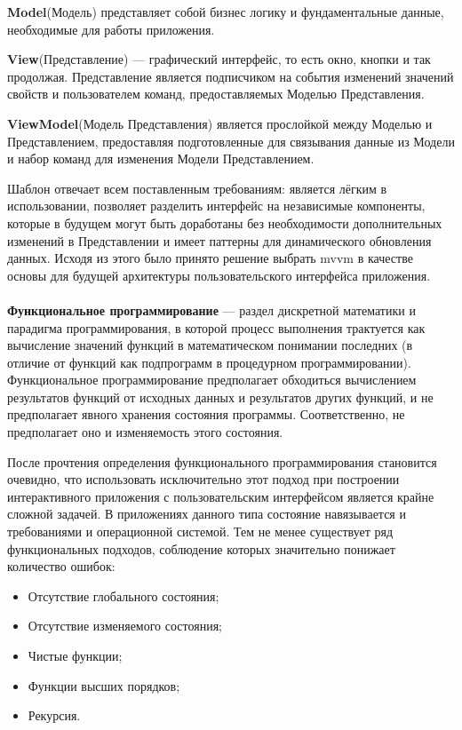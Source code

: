 \textbf{Model}(Модель) представляет собой бизнес логику и фундаментальные данные, необходимые для работы приложения.

\textbf{View}(Представление) --- графический интерфейс, то есть окно, кнопки и так продолжая. Представление является подписчиком на события изменений значений свойств и пользователем команд, предоставляемых Моделью Представления.

\textbf{ViewModel}(Модель Представления) является прослойкой между Моделью и Представлением, предоставляя подготовленные для связывания данные из Модели и набор команд для изменения Модели Представлением.

Шаблон отвечает всем поставленным требованиям: является лёгким в использовании, позволяет разделить интерфейс на независимые компоненты, которые в будущем могут быть доработаны без необходимости дополнительных изменений в Представлении и имеет паттерны для динамического обновления данных. Исходя из этого было принято решение выбрать \gls{mvvm} в качестве основы для будущей архитектуры пользовательского интерфейса приложения.

\paragraph{}
\textbf{Функциональное программирование} --- раздел дискретной математики и парадигма программирования, в которой процесс выполнения трактуется как вычисление значений функций в математическом понимании последних (в отличие от функций как подпрограмм в процедурном программировании). Функциональное программирование предполагает обходиться вычислением результатов функций от исходных данных и результатов других функций, и не предполагает явного хранения состояния программы. Соответственно, не предполагает оно и изменяемость этого состояния. \cite{wiki:fp}

После прочтения определения функционального программирования становится очевидно, что использовать исключительно этот подход при построении интерактивного приложения с пользовательским интерфейсом является крайне сложной задачей. В приложениях данного типа состояние навязывается и требованиями и операционной системой. Тем не менее существует ряд функциональных подходов, соблюдение которых значительно понижает количество ошибок:

\begin{itemize}
\item Отсутствие глобального состояния;
\item Отсутствие изменяемого состояния;
\item Чистые функции;
\item Функции высших порядков;
\item Рекурсия.
\end{itemize}

